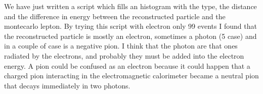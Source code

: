 We have just written a script which fills an histogram with the type, the distance and the difference in energy between the reconstructed particle and the montecarlo lepton.
By trying this script with electron only 99 events I found that the reconstructed particle is mostly an electron, sometimes a photon (5 case) and in a couple of case is a negative pion. I think that the photon are that ones radiated by the electrons, and probably they must be added into the electron energy. A pion could be confused as an electron because it could happen that a charged pion interacting in the electromagnetic calorimeter became a neutral pion that decays immediately in two photons.